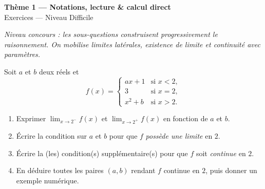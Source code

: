 \documentclass[11pt,a4paper]{article}
\begin{document}
\begin{center}
{\Large\bfseries\color{primarydark}Thème 1 — Notations, lecture \& calcul direct}\\[2pt]
{\large\color{primary}Exercices — Niveau Difficile}
\end{center}
\vspace{4pt}
{\small\itshape Niveau concours : les sous-questions construisent progressivement le raisonnement.
On mobilise limites latérales, existence de limite et continuité avec paramètres.}
\vspace{6pt}

\begin{exercice}
Soit $a$ et $b$ deux réels et
\[ f(x)=\begin{cases} ax+1 & \text{si } x<2,\\[2pt] 3 & \text{si } x=2,\\[2pt] x^2+b & \text{si } x>2.\end{cases} \]
\begin{enumerate}[label=\alph*),leftmargin=2em,itemsep=3pt]
  \item Exprimer $\displaystyle\lim_{x\to 2^{-}} f(x)$ et $\displaystyle\lim_{x\to 2^{+}} f(x)$ en fonction de $a$ et $b$.
  \item Écrire la condition sur $a$ et $b$ pour que $f$ \emph{possède une limite} en $2$.
  \item Écrire la (les) condition(s) supplémentaire(s) pour que $f$ soit \emph{continue} en $2$.
  \item En déduire toutes les paires $(a,b)$ rendant $f$ continue en $2$, puis donner un exemple numérique.
\end{enumerate}
\end{exercice}
\end{document}
